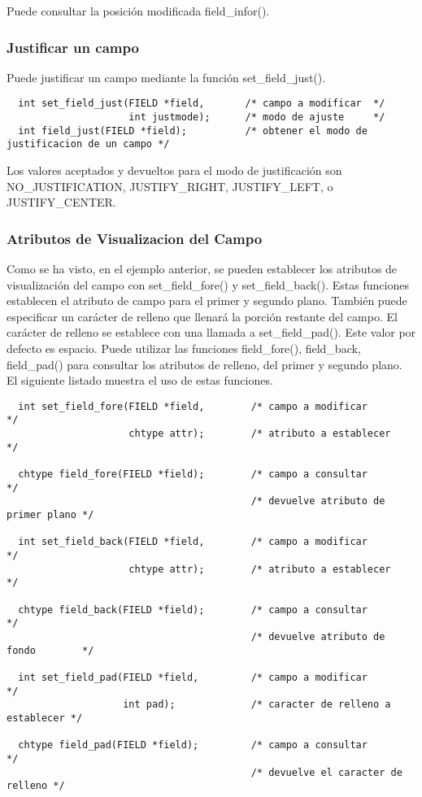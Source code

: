 \documentclass{article}
\begin{document}
Puede consultar la posición modificada field\_infor().

\subsubsection{Justificar un campo}%
Puede justificar un campo mediante la función set\_field\_just().

\begin{verbatim}
  int set_field_just(FIELD *field,       /* campo a modificar  */
                     int justmode);      /* modo de ajuste     */
  int field_just(FIELD *field);          /* obtener el modo de justificacion de un campo */
\end{verbatim}

Los valores aceptados y devueltos para el modo de justificación son
NO\_JUSTIFICATION, JUSTIFY\_RIGHT, JUSTIFY\_LEFT, o JUSTIFY\_CENTER.

\subsubsection{Atributos de Visualizacion del Campo}%
Como se ha visto, en el ejemplo anterior, se pueden establecer los atributos de
visualización del campo con set\_field\_fore() y set\_field\_back(). Estas
funciones establecen el atributo de campo para el primer y segundo plano.
También puede especificar un carácter de relleno que llenará la porción
restante del campo. El carácter de relleno se establece con una llamada a
set\_field\_pad(). Este valor por defecto es espacio. Puede utilizar las
funciones field\_fore(), field\_back, field\_pad() para consultar los atributos de
relleno, del primer y segundo plano. El siguiente listado muestra el uso de
estas funciones.

\begin{verbatim}
  int set_field_fore(FIELD *field,        /* campo a modificar                 */
                     chtype attr);        /* atributo a establecer             */

  chtype field_fore(FIELD *field);        /* campo a consultar                 */
                                          /* devuelve atributo de primer plano */

  int set_field_back(FIELD *field,        /* campo a modificar                 */
                     chtype attr);        /* atributo a establecer             */

  chtype field_back(FIELD *field);        /* campo a consultar                 */
                                          /* devuelve atributo de fondo        */

  int set_field_pad(FIELD *field,         /* campo a modificar                */
                    int pad);             /* caracter de relleno a establecer */

  chtype field_pad(FIELD *field);         /* campo a consultar                */
                                          /* devuelve el caracter de relleno */
\end{verbatim}
\end{document}
